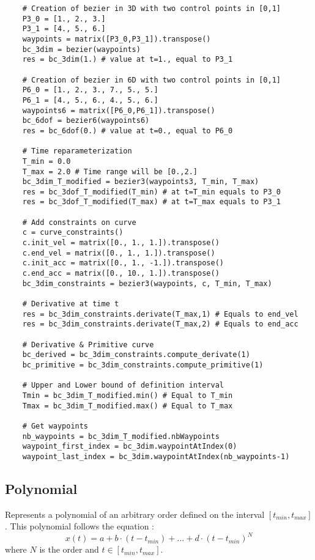 \documentclass{article}
\begin{document}
    \begin{lstlisting}
    # Creation of bezier in 3D with two control points in [0,1]
    P3_0 = [1., 2., 3.]
    P3_1 = [4., 5., 6.]
    waypoints = matrix([P3_0,P3_1]).transpose()
    bc_3dim = bezier(waypoints)
    res = bc_3dim(1.) # value at t=1., equal to P3_1

    # Creation of bezier in 6D with two control points in [0,1]
    P6_0 = [1., 2., 3., 7., 5., 5.]
    P6_1 = [4., 5., 6., 4., 5., 6.]
    waypoints6 = matrix([P6_0,P6_1]).transpose()
    bc_6dof = bezier6(waypoints6)
    res = bc_6dof(0.) # value at t=0., equal to P6_0

    # Time reparameterization
    T_min = 0.0
    T_max = 2.0 # Time range will be [0.,2.]
    bc_3dim_T_modified = bezier3(waypoints3, T_min, T_max)
    res = bc_3dof_T_modified(T_min) # at t=T_min equals to P3_0
    res = bc_3dof_T_modified(T_max) # at t=T_max equals to P3_1

    # Add constraints on curve
    c = curve_constraints()
    c.init_vel = matrix([0., 1., 1.]).transpose()
    c.end_vel = matrix([0., 1., 1.]).transpose()
    c.init_acc = matrix([0., 1., -1.]).transpose()
    c.end_acc = matrix([0., 10., 1.]).transpose()
    bc_3dim_constraints = bezier3(waypoints, c, T_min, T_max)

    # Derivative at time t
    res = bc_3dim_constraints.derivate(T_max,1) # Equals to end_vel
    res = bc_3dim_constraints.derivate(T_max,2) # Equals to end_acc

    # Derivative & Primitive curve
    bc_derived = bc_3dim_constraints.compute_derivate(1)
    bc_primitive = bc_3dim_constraints.compute_primitive(1)

    # Upper and Lower bound of definition interval
    Tmin = bc_3dim_T_modified.min() # Equal to T_min
    Tmax = bc_3dim_T_modified.max() # Equal to T_max

    # Get waypoints
    nb_waypoints = bc_3dim_T_modified.nbWaypoints
    waypoint_first_index = bc_3dim.waypointAtIndex(0)
    waypoint_last_index = bc_3dim.waypointAtIndex(nb_waypoints-1)
    \end{lstlisting}

\subsection{Polynomial}
    Represents a polynomial of an arbitrary order defined on the interval $[t_{min}, t_{max}]$. This polynomial follows the equation :
    \begin{equation}\label{eq:polynomial}
    x(t) = a + b\cdot(t - t_{min}) + ... + d\cdot(t - t_{min})^N
    \end{equation}
    where $N$ is the order and $t \in [t_{min}, t_{max}]$.\\
\end{document}

